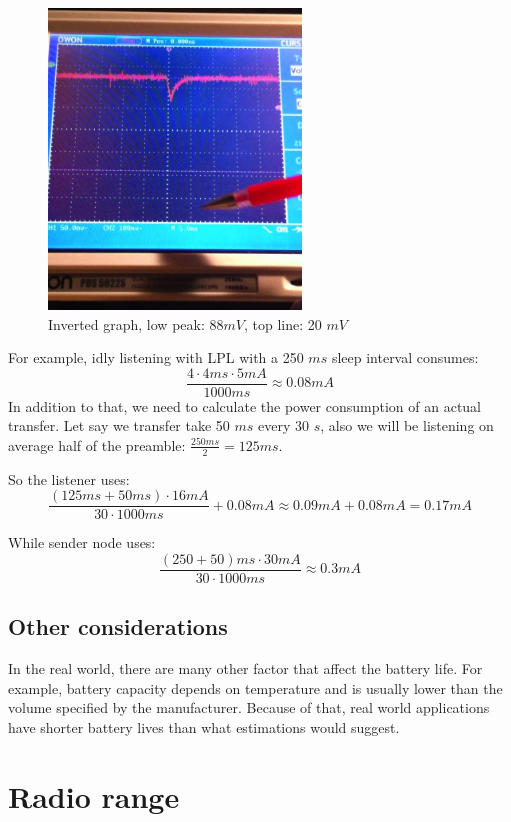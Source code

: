 \begin{figure}[h]
  \centering
  \includegraphics[width=0.6\textwidth]{img/low_power_receive_check.jpg}
  \caption{Inverted graph, low peak: $ 88 mV$, top line: 20 $ mV $}
  \label{fig:low_power_receive_check}
\end{figure}

For example, idly listening with LPL with a 250 $ ms $ sleep interval consumes:
$$
\frac{4 \cdot 4 ms \cdot 5 mA}{1000 ms} \approx 0.08 mA
$$
In addition to that, we need to calculate the power consumption of an actual transfer.
Let say we transfer take 50 $ ms $ every 30 $ s $, also we will be listening on average half of the preamble: $\frac{250 ms}{2} =  125 ms$.

So the listener uses:
$$
\frac{(125 ms + 50 ms) \cdot 16 mA}{30 \cdot 1000 ms}  + 0.08 mA \approx 0.09 mA + 0.08 mA = 0.17 mA
$$

While sender node uses:
$$
\frac{(250 + 50) ms \cdot 30 mA}{30 \cdot 1000 ms} \approx 0.3 mA
$$

\subsection{Other considerations}
In the real world, there are many other factor that affect the battery life.
For example, battery capacity depends on temperature and is usually lower than the volume specified by the manufacturer.
Because of that, real world applications have shorter battery lives than what estimations would suggest.


\section{Radio range}

